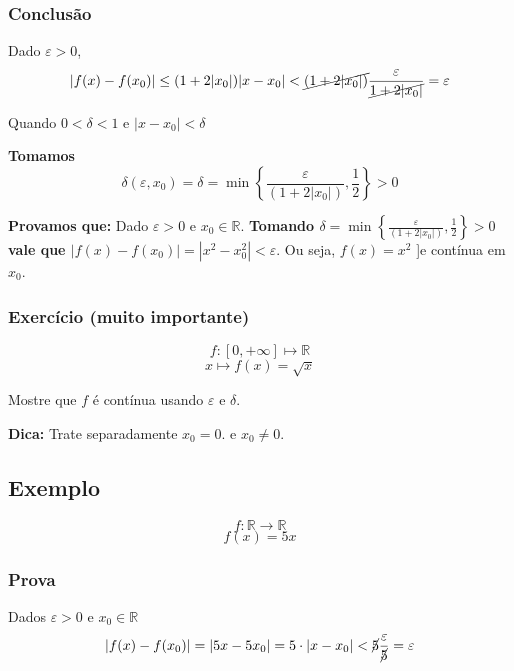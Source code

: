 \documentclass[12pt]{article}
\begin{document}
    \subsubsection*{Conclusão}
    Dado $\varepsilon > 0$, 
    \begin{equation*}
        |f(x) - f(x_0)| \leq (1+2|x_0|)|x-x_0| < \cancel{(1 + 2|x_0|)} \frac{\varepsilon}{\cancel{1+ 2|x_0|}} = \varepsilon
    \end{equation*}
    
    Quando $0 < \delta < 1$ e $|x - x_0| < \delta$

    \textbf{Tomamos}
    \begin{equation*}
        \delta (\varepsilon, x_0) = \delta = \min\left\{\frac{\varepsilon}{(1 + 2|x_0|)}, \frac{1}{2} \right\} > 0
    \end{equation*}
    
    \textbf{Provamos que: } Dado $\varepsilon > 0$ e $x_0 \in \mathbb{R}$. \textbf{Tomando $\delta = \min\left\{\frac{\varepsilon}{(1+2|x_0|)}, \frac{1}{2} \right\} > 0$ vale que $|f(x) - f(x_0)| = |x^2 - x_0^2| < \varepsilon$}. Ou seja, $f(x) = x^2$ ]e contínua em $x_0$.

    \subsubsection*{Exercício (muito importante)}
    \begin{equation*}
        f:\left[0, +\infty \right] \longmapsto \mathbb{R}
    \end{equation*}
    \begin{equation*}
        x \longmapsto f(x) = \sqrt{x}
    \end{equation*}

    Mostre que $f$ é contínua usando $\varepsilon$ e $\delta$.

    \textbf{Dica:} Trate separadamente $x_0 = 0$. e $x_0 \neq 0$.

    \subsection*{Exemplo} 
    \begin{equation*}
        f: \mathbb{R} \to \mathbb{R}
    \end{equation*}
    \begin{equation*}
        f(x) = 5x
    \end{equation*}

    \subsubsection*{Prova}
    Dados $\varepsilon > 0$ e $x_0 \in \mathbb{R}$
    \begin{equation*}
        |f(x) - f(x_0)| = |5x - 5x_0| = 5 \cdot |x - x_0| < \cancel{5}\frac{\varepsilon}{\cancel{5}} = \varepsilon
    \end{equation*}
\end{document}
